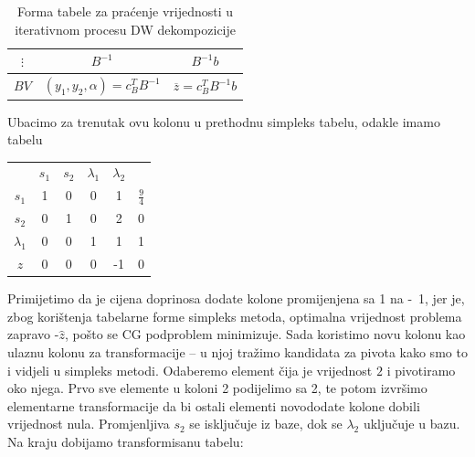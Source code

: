 \documentclass[a4paper, utf8, 11pt, colorlinks]{book}
\theoremstyle{definition}
\begin{document}
  \begin{table}\centering
 	\begin{tabular}{|c|c|c|} \hline
 		$\vdots$ & 	$B^{-1}$& $B^{-1}b$ \\
 		\hline
 		$BV$ &	$(y_1,y_2,\alpha)=c^T_B B^{-1}$ & $\overline{z}= c^T_B B^{-1}b$ \\	
 		\hline
 	\end{tabular}\caption{Forma tabele za praćenje vrijednosti u iterativnom procesu DW dekompozicije}\label{tbl:dw1}
 \end{table}
 
 

Ubacimo za trenutak ovu kolonu u prethodnu simpleks tabelu, odakle imamo tabelu

 \begin{center}
 	
 	\begin{tabular}{c|ccccc}
 	                &$s_1$        & $ s_2$   &  $\lambda_1$ & $\lambda_2$   &                \\
 		$s_1$	    &   1      &    0         &   0         &     1         &  $\frac{9}{4}$ \\
 		$s_2$	    &   0      &    1         &   0         &     2         &  0             \\
 		$\lambda_1$ &   0      &    0         &   1         &     1         &  1             \\ \hline
 		$z$         &   0      &    0         &   0         &    -1         &  0
 	\end{tabular}
 \end{center}
Primijetimo da je cijena doprinosa dodate kolone promijenjena sa 1 na -~1, jer je, zbog korištenja tabelarne forme simpleks metoda, optimalna vrijednost problema zapravo -$\hat{z}$, pošto se CG podproblem minimizuje. Sada koristimo novu kolonu kao ulaznu kolonu za transformacije -- u njoj tražimo kandidata za pivota kako smo to i vidjeli u simpleks metodi. Odaberemo element čija je vrijednost $2$ i pivotiramo oko njega. Prvo sve elemente u koloni 2 podijelimo sa 2, te potom izvršimo elementarne transformacije da bi ostali elementi novododate kolone dobili vrijednost nula. Promjenljiva $s_2$ se isključuje iz baze, dok se $\lambda_2$ uključuje u bazu. Na kraju dobijamo transformisanu tabelu:
\end{document}
